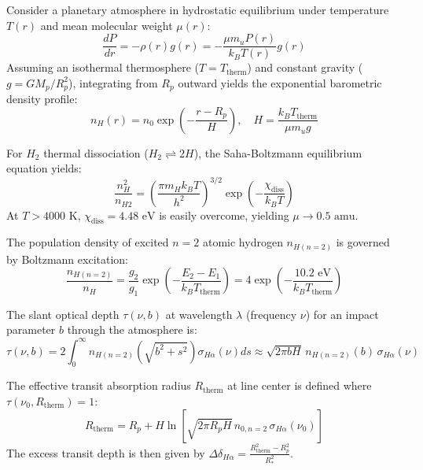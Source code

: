 \documentclass[11pt,a4paper]{article}
\begin{document}
Consider a planetary atmosphere in hydrostatic equilibrium under temperature $T(r)$ and mean molecular weight $\mu(r)$:
\begin{equation}
\frac{dP}{dr} = -\rho(r) g(r) = -\frac{\mu m_u P(r)}{k_B T(r)} g(r)
\end{equation}
Assuming an isothermal thermosphere ($T = T_{\text{therm}}$) and constant gravity ($g = G M_p / R_p^2$), integrating from $R_p$ outward yields the exponential barometric density profile:
\begin{equation}
n_H(r) = n_0 \exp\left(-\frac{r - R_p}{H}\right), \quad H = \frac{k_B T_{\text{therm}}}{\mu m_u g}
\end{equation}

For $H_2$ thermal dissociation ($H_2 \rightleftharpoons 2 H$), the Saha-Boltzmann equilibrium equation yields:
\begin{equation}
\frac{n_H^2}{n_{H2}} = \left(\frac{\pi m_H k_B T}{h^2}\right)^{3/2} \exp\left(-\frac{\chi_{\text{diss}}}{k_B T}\right)
\end{equation}
At $T > 4000\text{ K}$, $\chi_{\text{diss}} = 4.48\text{ eV}$ is easily overcome, yielding $\mu \to 0.5\text{ amu}$.

The population density of excited $n=2$ atomic hydrogen $n_{H(n=2)}$ is governed by Boltzmann excitation:
\begin{equation}
\frac{n_{H(n=2)}}{n_H} = \frac{g_2}{g_1} \exp\left(-\frac{E_2 - E_1}{k_B T_{\text{therm}}}\right) = 4 \exp\left(-\frac{10.2\text{ eV}}{k_B T_{\text{therm}}}\right)
\end{equation}

The slant optical depth $\tau(\nu, b)$ at wavelength $\lambda$ (frequency $\nu$) for an impact parameter $b$ through the atmosphere is:
\begin{equation}
\tau(\nu, b) = 2 \int_{0}^{\infty} n_{H(n=2)}\left(\sqrt{b^2 + s^2}\right) \sigma_{H\alpha}(\nu) ds \approx \sqrt{2\pi b H} \, n_{H(n=2)}(b) \, \sigma_{H\alpha}(\nu)
\end{equation}

The effective transit absorption radius $R_{\text{therm}}$ at line center is defined where $\tau(\nu_0, R_{\text{therm}}) = 1$:
\begin{equation}
R_{\text{therm}} = R_p + H \ln\left[ \sqrt{2\pi R_p H} \, n_{0, n=2} \, \sigma_{H\alpha}(\nu_0) \right]
\end{equation}
The excess transit depth is then given by $\Delta \delta_{H\alpha} = \frac{R_{\text{therm}}^2 - R_p^2}{R_*^2}$.
\end{document}
